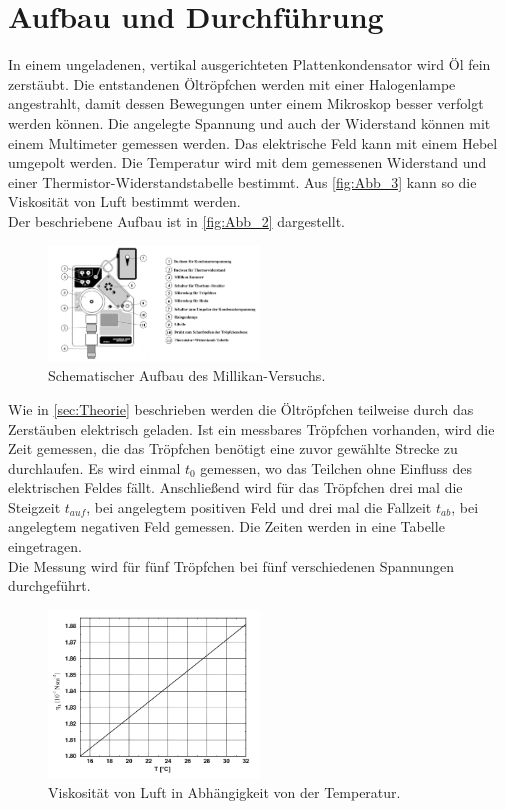 \section{Aufbau und Durchführung}
\label{sec:Durchführung}
In einem ungeladenen, vertikal ausgerichteten Plattenkondensator wird Öl fein
zerstäubt. Die entstandenen Öltröpfchen werden mit einer Halogenlampe angestrahlt, damit dessen Bewegungen
unter einem Mikroskop besser verfolgt werden können. Die angelegte Spannung und auch der Widerstand können mit
einem Multimeter gemessen werden. Das elektrische Feld kann 
mit einem Hebel umgepolt werden. Die Temperatur wird mit dem gemessenen Widerstand 
und einer Thermistor-Widerstandstabelle bestimmt. Aus \autoref{fig:Abb_3} kann so die Viskosität von Luft bestimmt werden.\\
Der beschriebene Aufbau ist in \autoref{fig:Abb_2} dargestellt.
\begin{figure}[H]
    \centering
    \includegraphics[width=0.5\textwidth]{Abbildungen/Abb_2.png}
    \caption {Schematischer Aufbau des Millikan-Versuchs\cite[3]{V503}.}
    \label{fig:Abb_2}
\end{figure}
Wie in \autoref{sec:Theorie} beschrieben werden die Öltröpfchen teilweise durch das Zerstäuben 
elektrisch geladen. Ist ein messbares Tröpfchen vorhanden, wird die Zeit gemessen, die 
das Tröpfchen benötigt eine zuvor gewählte Strecke zu durchlaufen.
Es wird einmal $t_0$ gemessen, wo das Teilchen ohne Einfluss des elektrischen Feldes fällt.
Anschließend wird für das Tröpfchen drei mal die Steigzeit $t_{auf}$, bei angelegtem positiven Feld und drei mal die Fallzeit $t_{ab}$,
bei angelegtem negativen Feld gemessen. Die Zeiten werden in eine Tabelle eingetragen.\\
Die Messung wird für fünf Tröpfchen bei fünf verschiedenen Spannungen durchgeführt.
\begin{figure}[H]
    \centering
    \includegraphics[width=0.5\textwidth]{Abbildungen/Abb_3.png}
    \caption {Viskosität von Luft in Abhängigkeit von der Temperatur\cite[5]{V503}.}
    \label{fig:Abb_3}
\end{figure}